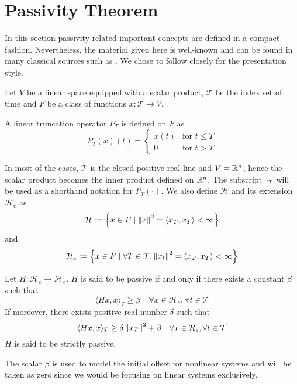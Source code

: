 \section{Passivity Theorem}
In this section passivity related important concepts are defined in a compact fashion. Nevertheless, the material given here 
is well-known and can be found in many classical sources such as \cite{hillmoylan77,desvid,vdschaftbook}. We chose to 
follow closely \cite{desvid} for the presentation style. 

Let $V$ be a linear space equipped with a scalar product, $\mathcal{T}$ be the index set of time and $F$ be a class of functions 
$x:\mathcal{T}\to V$.
\begin{define} A linear truncation operator $P_T$ is defined on $F$ as 
\begin{equation}
P_T(x)(t) = \begin{cases} x(t) &\text{for } t\leq T\\ 0 &\text{for } t>T\end{cases}
\label{eq:apdx:trunc}
\end{equation}
\end{define}

In most of the cases, $\mathcal{T}$ is the closed positive real line and $V=\mathbb{R}^n$, hence the scalar product becomes the inner product 
defined on $\mathbb{R}^n$. The subscript ${\cdot}_T$ will be used as a shorthand notation for $P_T(\cdot)$. We also define $\mathcal{H}$ 
and its extension $\mathcal{H}_e$ as 
\[
\mathcal{H} := \left\{ x\in F\mid \displaystyle \left\| x \right\|^2=\langle x_T,x_T \rangle<\infty \right\}
\]
and
\[
\mathcal{H}_e := \left\{ x\in F\mid \forall T\in\mathcal{T}, \displaystyle \left\| x_t \right\|^2=\langle x_T,x_T \rangle<\infty \right\}
\]



\begin{define}Let $H:\mathcal{H}_e\to\mathcal{H}_e$. $H$ is said to be passive if and only if there exists a constant 
$\beta$ such that
\[
\langle Hx,x \rangle_T \geq \beta\quad \forall x\in\mathcal{H}_e,\forall t\in\mathcal{T}
\]
If moreover, there exists positive real number $\delta$ such that
\[
\langle Hx,x \rangle_T \geq \delta\displaystyle \left\| x_T \right\|^2+ \beta\quad \forall x\in\mathcal{H}_e,\forall t\in\mathcal{T}
\]
$H$ is said to be strictly passive. 
\end{define}
The scalar $\beta$ is used to model the initial offset for nonlinear systems and 
will be taken as zero since we would be focusing on linear systems exclusively. 


